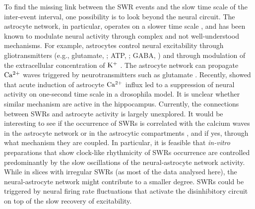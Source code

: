     To find the missing link between the SWR events and the slow time scale of
    the inter-event interval, one possibility is to look beyond the neural
    circuit. The astrocyte network, in particular, operates on a slower time
    scale \cite[$\sim 500 \,\rm ms$,][]{Sasaki2014}, and has been known to
    modulate neural activity through complex and not well-understood
    mechanisms. For example, astrocytes control neural excitability through
    gliotransmitters (e.g., glutamate, \citealp{Parpura1994}; ATP,
    \citealp{Newman2001}; GABA, \citealp{Liu2000}) and through modulation of
    the extracellular concentration of $\rm K^+$ \citep{Wang2012}. The
    astrocyte network can propagate $\rm Ca^{2+}$ waves triggered by
    neurotransmitters such as glutamate \citep[e.g.,][]{Cornell1990}.
    Recently, \cite{Zhang2017} showed that acute induction of astrocyte $\rm
    Ca^{2+}$ influx led to a suppression of neural activity on one-second time
    scale in a drosophila model. It is unclear whether similar mechanism are
    active in the hippocampus. Currently, the connections between SWRs and
    astrocyte activity is largely unexplored. It would be interesting to see if
    the occurrence of SWRs is correlated with the calcium waves in the
    astrocyte network or in the astrocytic compartments \citep{Oschmann2017},
    and if yes, through what mechanism they are coupled. In particular, it is
    feasible that \textit{in-vitro} preparations that show clock-like
    rhythmicity of SWRs occurrence are controlled predominantly by the slow
    oscillations of the neural-astrocyte network activity. While in slices with
    irregular SWRs (as most of the data analysed here), the neural-astrocyte
    network might contribute to a smaller degree.  SWRs could be triggered by
    neural firing rate fluctuations that activate the disinhibitory circuit on
    top of the slow recovery of excitability.

    \begin{comment} 
    $\rm Na^+$, $\rm Ca^{2+}$, An alternative extra-neuronal
    circuit mightjka...2,3 general sentences!! glia, astro calcium,
    potassium, glutamate, adenosize (felin2006)

    astrocites controlling extrasynaptic Ca+2, can this be another slow
    variable for the iSWi?  Aivar2014: extracellular calcium controls the type
    of events: SWR or epileptic bursts, their size etc.  Sasaki2014: astrocyte
    calcium signalling modulates the extrasynaptic calcium and also the neural
    synchronisation is incidence correlated with the speed of perfusion?
    excess or insufficient resources suppress SWRs
    pefusion: if excess then increasing perfusion will smear it out, increases SWRs
            if insufficient: then slowing down the perfusion, will help build up and increase SWs
    sasaki2008: decay of calcium transients sim to 500ms; 400-600 ms
    would be cool to check if SWs coincide with astrocyte spikes

    especially in the slice models that show regular SWRs

    King2001: extrasynaptic Ca as control for STD
    also potassium;...
    \end{comment}

